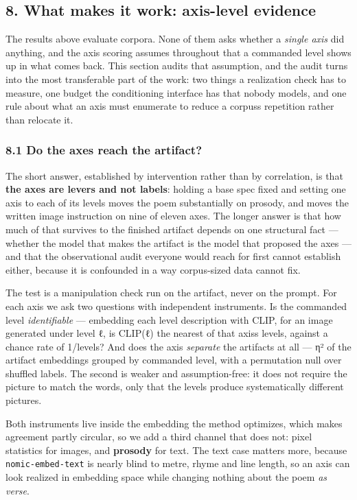 \documentclass[
  10pt,
]{article}
\theoremstyle{plain}
\theoremstyle{definition}
\begin{document}
\subsection{8. What makes it work: axis-level
evidence}\label{8-what-makes-it-work-axis-level-evidence}

The results above evaluate corpora. None of them asks whether a
\emph{single axis} did anything, and the axis scoring assumes throughout
that a commanded level shows up in what comes back. This section audits
that assumption, and the audit turns into the most transferable part of
the work: two things a realization check has to measure, one budget the
conditioning interface has that nobody models, and one rule about what
an axis must enumerate to reduce a corpus\textquotesingle s repetition
rather than relocate it.

\subsubsection{8.1 Do the axes reach the
artifact?}\label{81-do-the-axes-reach-the-artifact}

The short answer, established by intervention rather than by
correlation, is that \textbf{the axes are levers and not labels}:
holding a base spec fixed and setting one axis to each of its levels
moves the poem substantially on prosody, and moves the written image
instruction on nine of eleven axes. The longer answer is that how much
of that survives to the finished artifact depends on one structural fact
--- whether the model that makes the artifact is the model that proposed
the axes --- and that the observational audit everyone would reach for
first cannot establish either, because it is confounded in a way
corpus-sized data cannot fix.

The test is a manipulation check run on the artifact, never on the
prompt. For each axis we ask two questions with independent instruments.
Is the commanded level \emph{identifiable} --- embedding each level
description with CLIP, for an image generated under level ℓ, is CLIP(ℓ)
the nearest of that axis\textquotesingle s levels, against a chance rate
of 1/\textbar levels\textbar? And does the axis \emph{separate} the
artifacts at all --- η² of the artifact embeddings grouped by commanded
level, with a permutation null over shuffled labels. The second is
weaker and assumption-free: it does not require the picture to match the
words, only that the levels produce systematically different pictures.

Both instruments live inside the embedding the method optimizes, which
makes agreement partly circular, so we add a third channel that does
not: pixel statistics for images, and \textbf{prosody} for text. The
text case matters more, because \texttt{nomic-embed-text} is nearly
blind to metre, rhyme and line length, so an axis can look realized in
embedding space while changing nothing about the poem \emph{as verse}.
\end{document}
